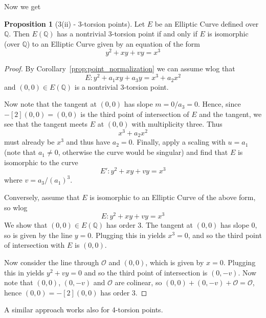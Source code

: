\documentclass{scrartcl}
\newcommand{\Q}{\mathbb{Q}}
\renewcommand{\O}{\mathcal{O}}
\theoremstyle{definition}
\newtheorem{prop}[subsection]{Proposition}
\begin{document}
Now we get
\begin{prop}[3(ii) - 3-torsion points]
    Let $E$ be an Elliptic Curve defined over $\Q$.
    Then $E(\Q)$ has a nontrivial 3-torsion point if and only if $E$ is isomorphic (over $\Q$) to an Elliptic Curve given by an equation of the form
    \begin{equation*}
        y^2 + x y + v y = x^3
    \end{equation*}
\end{prop}
\begin{proof}
    By Corollary~\ref{prop:point_normalization} we can assume wlog that
    \begin{equation*}
        E: y^2 + a_1 x y + a_3 y = x^3 + a_2 x^2
    \end{equation*}
    and $(0, 0) \in E(\Q)$ is a nontrivial 3-torsion point.

    Now note that the tangent at $(0, 0)$ has slope $m = 0/a_3 = 0$.
    Hence, since $-[2](0, 0) = (0, 0)$ is the third point of intersection of $E$ and the tangent, we see that the tangent meets $E$ at $(0, 0)$ with multiplicity three.
    Thus
    \begin{equation*}
        x^3 + a_2 x^2 
    \end{equation*}
    must already be $x^3$ and thus have $a_2 = 0$.
    Finally, apply a scaling with $u = a_1$ (note that $a_1 \neq 0$, otherwise the curve would be singular) and find that $E$ is isomorphic to the curve
    \begin{equation*}
        E': y^2 + x y + v y = x^3
    \end{equation*}
    where $v = a_3 / (a_1)^3$.

    Conversely, assume that $E$ is isomorphic to an Elliptic Curve of the above form, so wlog
    \begin{equation*}
        E: y^2 + x y + v y = x^3
    \end{equation*}
    We show that $(0, 0) \in E(\Q)$ has order 3.
    The tangent at $(0, 0)$ has slope $0$, so is given by the line $y = 0$.
    Plugging this in yields $x^3 = 0$, and so the third point of intersection with $E$ is $(0, 0)$.
    
    Now consider the line through $\O$ and $(0, 0)$, which is given by $x = 0$.
    Plugging this in yields $y^2 + v y = 0$ and so the third point of intersection is $(0, -v)$.
    Now note that $(0, 0)$, $(0, -v)$ and $\O$ are colinear, so $(0, 0) + (0, -v) + \O = \O$, hence $(0, 0) = -[2](0, 0)$ has order 3.
\end{proof}
A similar approach works also for 4-torsion points.
\end{document}
